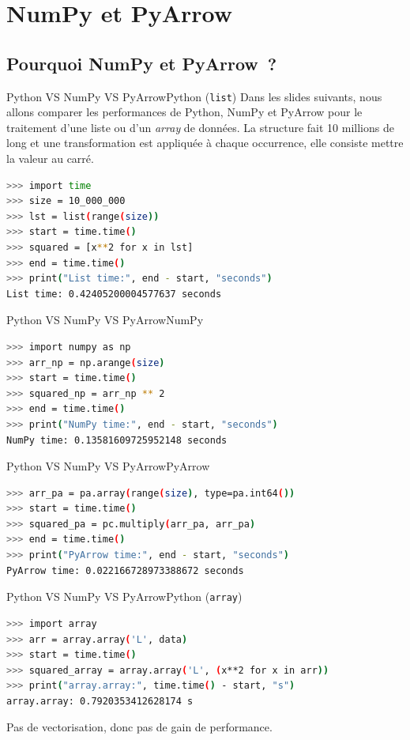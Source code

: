 \documentclass{beamer}
\begin{document}
    \section{NumPy et PyArrow}

    \subsection{Pourquoi NumPy et PyArrow~?}
    \begin{frame}[fragile]{Python VS NumPy VS PyArrow}{Python (\lstinline{list})}
        Dans les slides suivants, nous allons comparer les performances de Python, NumPy et PyArrow pour le traitement d'une liste ou d'un \textit{array} de données.
        La structure fait 10 millions de long et une transformation est appliquée à chaque occurrence, elle consiste mettre la valeur au carré.
        \begin{lstlisting}[language=bash]
>>> import time
>>> size = 10_000_000
>>> lst = list(range(size))
>>> start = time.time()
>>> squared = [x**2 for x in lst]
>>> end = time.time()
>>> print("List time:", end - start, "seconds")
List time: 0.42405200004577637 seconds
        \end{lstlisting}
    \end{frame}

    \begin{frame}[fragile]{Python VS NumPy VS PyArrow}{NumPy}
        \begin{lstlisting}[language=bash]
>>> import numpy as np
>>> arr_np = np.arange(size)
>>> start = time.time()
>>> squared_np = arr_np ** 2
>>> end = time.time()
>>> print("NumPy time:", end - start, "seconds")
NumPy time: 0.13581609725952148 seconds
        \end{lstlisting}
    \end{frame}

    \begin{frame}[fragile]{Python VS NumPy VS PyArrow}{PyArrow}
        \begin{lstlisting}[language=bash]
>>> arr_pa = pa.array(range(size), type=pa.int64())
>>> start = time.time()
>>> squared_pa = pc.multiply(arr_pa, arr_pa)
>>> end = time.time()
>>> print("PyArrow time:", end - start, "seconds")
PyArrow time: 0.022166728973388672 seconds
        \end{lstlisting}
    \end{frame}

    \begin{frame}[fragile]{Python VS NumPy VS PyArrow}{Python (\lstinline{array})}
        \begin{lstlisting}[language=bash]
>>> import array
>>> arr = array.array('L', data)
>>> start = time.time()
>>> squared_array = array.array('L', (x**2 for x in arr))
>>> print("array.array:", time.time() - start, "s")
array.array: 0.7920353412628174 s
        \end{lstlisting}
        \begin{dangercolorbox}
            Pas de vectorisation, donc pas de gain de performance.
        \end{dangercolorbox}
    \end{frame}
\end{document}
